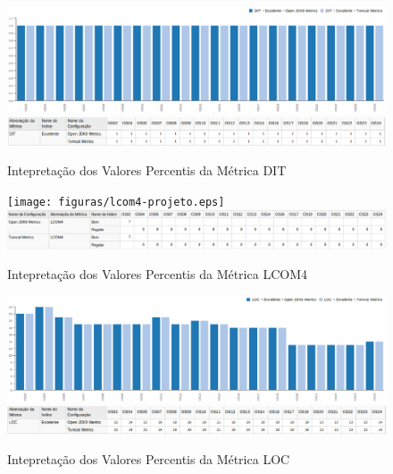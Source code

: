 \begin{apendicesenv}
\begin{figure}
\centering
\includegraphics[scale=0.70]{figuras/dit-grafico.eps}
\includegraphics[scale=0.70]{figuras/dit-tabela.eps}
\caption{Intepretação dos Valores Percentis da Métrica DIT}
\label{fig:metric-dit}
\FloatBarrier
\end{figure}



\begin{figure}
\centering
\texttt{[image: figuras/lcom4-projeto.eps]}
\includegraphics[scale=0.5]{figuras/lcom4-completo.eps}
\caption{Intepretação dos Valores Percentis da Métrica LCOM4}
\label{fig:metric-LCOM4}
\FloatBarrier
\end{figure}


\begin{figure}
\centering
\includegraphics[scale=0.70]{figuras/loc-grafico.eps}
\includegraphics[scale=0.70]{figuras/loc-tabela.eps}
\caption{Intepretação dos Valores Percentis da Métrica LOC}
\label{fig:metric-loc}
\FloatBarrier
\end{figure}


\end{apendicesenv}
